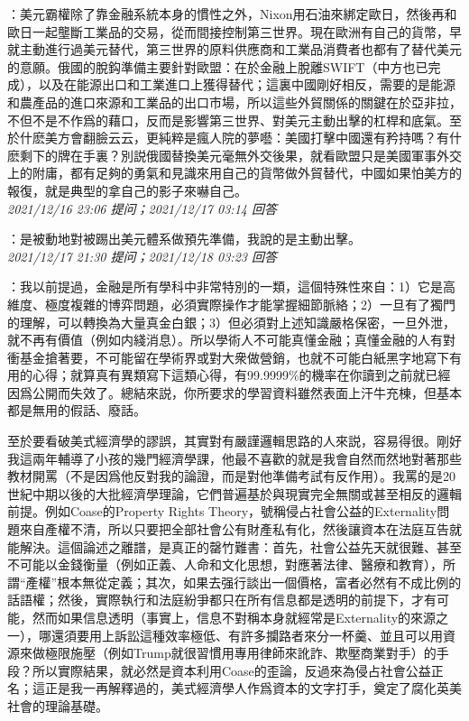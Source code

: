 \documentclass[twocolumn]{ctexart}
\begin{document}
：美元霸權除了靠金融系統本身的慣性之外，Nixon用石油來綁定歐日，然後再和歐日一起壟斷工業品的交易，從而間接控制第三世界。現在歐洲有自己的貨幣，早就主動進行過美元替代，第三世界的原料供應商和工業品消費者也都有了替代美元的意願。俄國的脫鈎準備主要針對歐盟：在於金融上脫離SWIFT（中方也已完成），以及在能源出口和工業進口上獲得替代；這裏中國剛好相反，需要的是能源和農產品的進口來源和工業品的出口市場，所以這些外貿關係的關鍵在於亞非拉，不但不是不作爲的藉口，反而是影響第三世界、對美元主動出擊的杠桿和底氣。至於什麽美方會翻臉云云，更純粹是瘋人院的夢囈：美國打擊中國還有矜持嗎？有什麽剩下的牌在手裏？別説俄國替換美元毫無外交後果，就看歐盟只是美國軍事外交上的附庸，都有足夠的勇氣和見識來用自己的貨幣做外貿替代，中國如果怕美方的報復，就是典型的拿自己的影子來嚇自己。
\\

\textit{\hfill\noindent\small 2021/12/16 23:06 提问；2021/12/17 03:14 回答}

：是被動地對被踢出美元體系做預先準備，我說的是主動出擊。
\\

\textit{\hfill\noindent\small 2021/12/17 21:30 提问；2021/12/18 03:23 回答}

：我以前提過，金融是所有學科中非常特別的一類，這個特殊性來自：1）它是高維度、極度複雜的博弈問題，必須實際操作才能掌握細節脈絡；2）一旦有了獨門的理解，可以轉換為大量真金白銀；3）但必須對上述知識嚴格保密，一旦外泄，就不再有價值（例如内綫消息）。所以學術人不可能真懂金融；真懂金融的人有對衝基金搶著要，不可能留在學術界或對大衆做營銷，也就不可能白紙黑字地寫下有用的心得；就算真有異類寫下這類心得，有99.9999\%的機率在你讀到之前就已經因爲公開而失效了。總結來説，你所要求的學習資料雖然表面上汗牛充棟，但基本都是無用的假話、廢話。

至於要看破美式經濟學的謬誤，其實對有嚴謹邏輯思路的人來説，容易得很。剛好我這兩年輔導了小孩的幾門經濟學課，他最不喜歡的就是我會自然而然地對著那些教材開罵（不是因爲他反對我的論證，而是對他準備考試有反作用）。我罵的是20世紀中期以後的大批經濟學理論，它們普遍基於與現實完全無關或甚至相反的邏輯前提。例如Coase的Property Rights Theory，號稱侵占社會公益的Externality問題來自產權不清，所以只要把全部社會公有財產私有化，然後讓資本在法庭互告就能解決。這個論述之離譜，是真正的罄竹難書：首先，社會公益先天就很難、甚至不可能以金錢衡量（例如正義、人命和文化思想，對應著法律、醫療和教育），所謂“產權”根本無從定義；其次，如果去强行談出一個價格，富者必然有不成比例的話語權；然後，實際執行和法庭紛爭都只在所有信息都是透明的前提下，才有可能，然而如果信息透明（事實上，信息不對稱本身就經常是Externality的來源之一），哪還須要用上訴訟這種效率極低、有許多攔路者來分一杯羹、並且可以用資源來做極限施壓（例如Trump就很習慣用專用律師來訛詐、欺壓商業對手）的手段？所以實際結果，就必然是資本利用Coase的歪論，反過來為侵占社會公益正名；這正是我一再解釋過的，美式經濟學人作爲資本的文字打手，奠定了腐化英美社會的理論基礎。
\\
\end{document}
